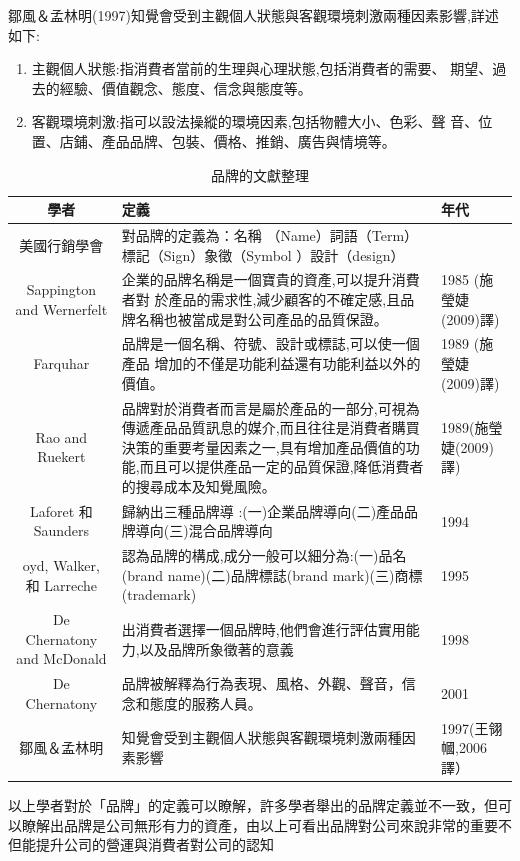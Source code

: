  鄒風＆孟林明(1997)知覺會受到主觀個人狀態與客觀環境刺激兩種因素影響,詳述如下:
\begin{enumerate}
\item 主觀個人狀態:指消費者當前的生理與心理狀態,包括消費者的需要、 期望、過去的經驗、價值觀念、態度、信念與態度等。
\item  客觀環境刺激:指可以設法操縱的環境因素,包括物體大小、色彩、聲 音、位置、店鋪、產品品牌、包裝、價格、推銷、廣告與情境等。
\end{enumerate}

\begin{table}[htb]
\caption{品牌的文獻整理}
\label{tab:PL1}
\centering
%
\begin{tabular}[t]{|c|p{8.5cm}|p{2.5cm}|} %
\hline
學者&定義 & 年代 \tabularnewline
\hline
美國行銷學會 & 對品牌的定義為：名稱 （Name）詞語（Term） 標記（Sign）象徵（Symbol ）設計（design）&  \tabularnewline
\hline
Sappington and Wernerfelt  &企業的品牌名稱是一個寶貴的資產,可以提升消費者對
於產品的需求性,減少顧客的不確定感,且品牌名稱也被當成是對公司產品的品質保證。& 1985 (施瑩婕(2009)譯) \tabularnewline
\hline
Farquhar &品牌是一個名稱、符號、設計或標誌,可以使一個產品
增加的不僅是功能利益還有功能利益以外的價值。&1989 (施瑩婕(2009)譯) \tabularnewline
\hline
Rao and Ruekert &品牌對於消費者而言是屬於產品的一部分,可視為傳遞產品品質訊息的媒介,而且往往是消費者購買決策的重要考量因素之一,具有增加產品價值的功能,而且可以提供產品一定的品質保證,降低消費者的搜尋成本及知覺風險。&1989(施瑩婕(2009)譯)  \tabularnewline
\hline
 Laforet 和 Saunders&歸納出三種品牌導 :(一)企業品牌導向(二)產品品牌導向(三)混合品牌導向
&1994\tabularnewline
\hline
oyd, Walker, 和 Larreche&認為品牌的構成,成分一般可以細分為:(一)品名(brand name)(二)品牌標誌(brand mark)(三)商標(trademark)&1995\tabularnewline
\hline
De Chernatony and McDonald&出消費者選擇一個品牌時,他們會進行評估實用能力,以及品牌所象徵著的意義&1998
\tabularnewline
\hline
De Chernatony&品牌被解釋為行為表現、風格、外觀、聲音，信念和態度的服務人員。&2001
\tabularnewline
\hline
 鄒風＆孟林明&知覺會受到主觀個人狀態與客觀環境刺激兩種因素影響
&1997(王翎幗,2006譯）\tabularnewline
\hline
\end{tabular}
\end{table}

以上學者對於「品牌」的定義可以瞭解，許多學者舉出的品牌定義並不一致，但可以瞭解出品牌是公司無形有力的資產，由以上可看出品牌對公司來說非常的重要不但能提升公司的營運與消費者對公司的認知

